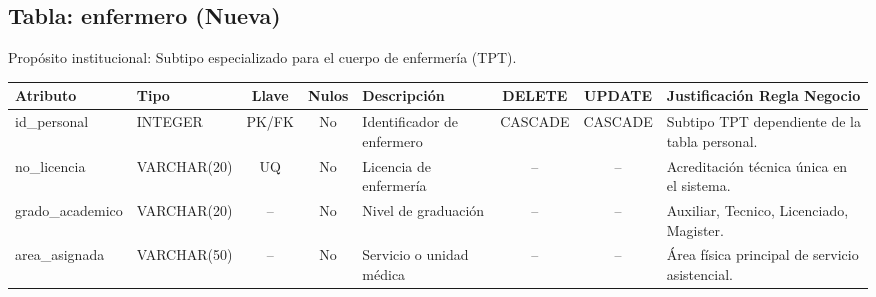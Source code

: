 \documentclass[11pt,a4paper]{article}
\begin{document}
\subsection{Tabla: enfermero (Nueva)}
Propósito institucional: Subtipo especializado para el cuerpo de enfermería (TPT).
\begin{table}[H]
\centering
\scriptsize
\begin{tabularx}{\linewidth}{|l|l|c|c|X|c|c|X|}
\hline
\textbf{Atributo} & \textbf{Tipo} & \textbf{Llave} & \textbf{Nulos} & \textbf{Descripción} & \textbf{DELETE} & \textbf{UPDATE} & \textbf{Justificación Regla Negocio} \\
\hline
id\_personal & INTEGER & PK/FK & No & Identificador de enfermero & CASCADE & CASCADE & Subtipo TPT dependiente de la tabla personal. \\
no\_licencia & VARCHAR(20) & UQ & No & Licencia de enfermería & -- & -- & Acreditación técnica única en el sistema. \\
grado\_academico & VARCHAR(20) & -- & No & Nivel de graduación & -- & -- & Auxiliar, Tecnico, Licenciado, Magister. \\
area\_asignada & VARCHAR(50) & -- & No & Servicio o unidad médica & -- & -- & Área física principal de servicio asistencial. \\
\hline
\end{tabularx}
\end{table}
\end{document}
